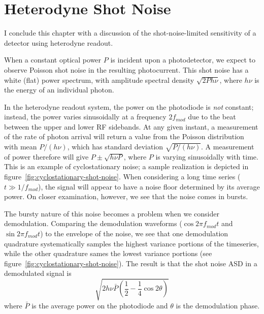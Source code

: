 \section{Heterodyne Shot Noise}

I conclude this chapter with a discussion of the shot-noise-limited
sensitivity of a detector using heterodyne readout.

When a constant optical power $P$ is incident upon a photodetector, we
expect to observe Poisson shot noise in the resulting photocurrent.
This shot noise has a white (flat) power spectrum, with amplitude
spectral density $\sqrt{2 P h \nu}$, where $h\nu$ is the energy of an
individual photon.

In the heterodyne readout system, the power on the photodiode is
\emph{not} constant; instead, the power varies sinusoidally at a
frequency $2f_{mod}$ due to the beat between the upper and lower RF
sidebands.  At any given instant, a measurement of the rate of photon
arrival will return a value from the Poisson distribution with mean
$P/(h\nu)$, which has standard deviation $\sqrt{P/(h\nu)}$.  A
measurement of power therefore will give $P\pm\sqrt{h\nu P}$, where
$P$ is varying sinusoidally with time.  This is an example of
cyclostationary noise; a sample realization is depicted in
figure~\ref{fig:cyclostationary-shot-noise}.  When considering a long
time series ($t\gg1/f_{mod}$), the signal will appear to have a noise
floor determined by its average power.  On closer examination,
however, we see that the noise comes in bursts.

The bursty nature of this noise becomes a problem when we consider
demodulation.  Comparing the demodulation waveforms ($\cos 2\pi
f_{mod} t$ and $\sin 2\pi f_{mod} t$) to the envelope of the noise, we
see that one demodulation quadrature systematically samples the
highest variance portions of the timeseries, while the other
quadrature sames the lowest variance portions (see
figure~\ref{fig:cyclostationary-shot-noise}).  The
result\cite{Niebauer1991Nonstationary} is that the shot noise ASD in a
demodulated signal is
\begin{equation}
\sqrt{2h\nu\bar{P} \left( \frac{1}{2}-\frac{1}{4}\cos2\theta\right)}
\end{equation}
where $\bar{P}$ is the average power on the photodiode and $\theta$ is
the demodulation phase.


